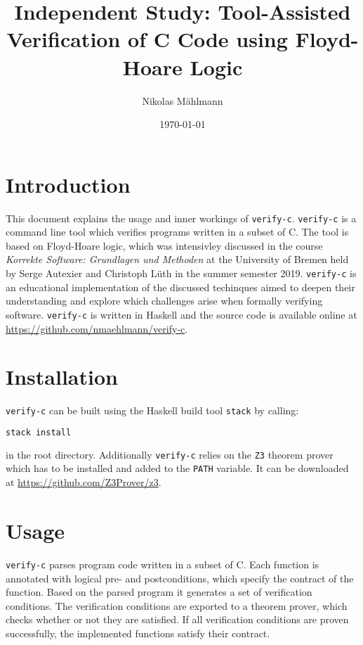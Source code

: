 \documentclass[12pt]{article}
\begin{document}
\setlength{\parindent}{0pt}
\newcommand{\verifyc}[0]{\texttt{verify-c}\xspace}
\newcommand{\zthree}[0]{\texttt{Z3}\xspace}

\title{Independent Study: Tool-Assisted Verification of C Code using Floyd-Hoare Logic}
\author{Nikolas Mählmann}
\date{\today}

\maketitle

\section{Introduction}
This document explains the usage and inner workings of \verifyc. 
\verifyc is a command line tool which verifies programs written in a subset of C. 
The tool is based on Floyd-Hoare logic, which was intensivley discussed in the course \emph{Korrekte Software: Grundlagen und Methoden} at the University of Bremen held by Serge Autexier and Christoph Lüth in the summer semester 2019. \verifyc is an educational implementation of the discussed techinques aimed to deepen their understanding and explore which challenges arise when formally verifying software. 
\verifyc is written in Haskell and the source code is available online at \url{https://github.com/nmaehlmann/verify-c}.

\section{Installation}
\verifyc can be built using the Haskell build tool \texttt{stack} by calling:

\begin{lstlisting}[language=bash]
stack install
\end{lstlisting}

in the root directory.
Additionally \verifyc relies on the \zthree theorem prover which has to be installed and added to the \texttt{PATH} variable.
It can be downloaded at \url{https://github.com/Z3Prover/z3}.
  

\section{Usage}
\verifyc parses program code written in a subset of C.
Each function is annotated with logical pre- and postconditions, which specify the contract of the function.
Based on the parsed program it generates a set of verification conditions.
The verification conditions are exported to a theorem prover, which checks whether or not they are satisfied.
If all verification conditions are proven successfully, the implemented functions satisfy their contract.
\end{document}
